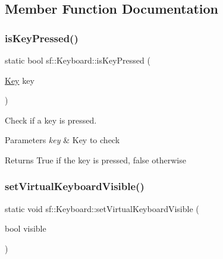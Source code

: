 \subsection{Member Function Documentation}
\mbox{\label{classsf_1_1_keyboard_a80a04b2f53005886957f49eee3531599}} 
\subsubsection{\texorpdfstring{is\+Key\+Pressed()}{isKeyPressed()}}
{\footnotesize\ttfamily static bool sf\+::\+Keyboard\+::is\+Key\+Pressed (\begin{DoxyParamCaption}\item[{\hyperlink{classsf_1_1_keyboard_acb4cacd7cc5802dec45724cf3314a142}{Key}}]{key }\end{DoxyParamCaption})\hspace{0.3cm}{\ttfamily [static]}}



Check if a key is pressed. 


\begin{DoxyParams}{Parameters}
{\em key} & Key to check\\
\hline
\end{DoxyParams}
\begin{DoxyReturn}{Returns}
True if the key is pressed, false otherwise 
\end{DoxyReturn}
\mbox{\label{classsf_1_1_keyboard_ad61fee7e793242d444a8c5acd662fe5b}} 
\subsubsection{\texorpdfstring{set\+Virtual\+Keyboard\+Visible()}{setVirtualKeyboardVisible()}}
{\footnotesize\ttfamily static void sf\+::\+Keyboard\+::set\+Virtual\+Keyboard\+Visible (\begin{DoxyParamCaption}\item[{bool}]{visible }\end{DoxyParamCaption})\hspace{0.3cm}{\ttfamily [static]}}



